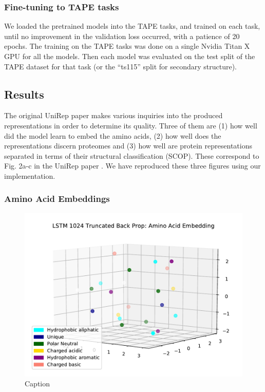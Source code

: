 \documentclass[a4paper,12pt]{article}
\begin{document}
\subsubsection{Fine-tuning to TAPE tasks}
We loaded the pretrained models into the TAPE tasks, and trained on each task, until no improvement in the validation loss occurred, with a patience of 20 epochs. The training on the TAPE tasks was done on a single Nvidia Titan X GPU for all the models. Then each model was evaluated on the test split of the TAPE dataset for that task (or the ``ts115'' split for secondary structure).

\subsection{Results}
The original UniRep paper makes various inquiries into the produced representations in order to determine its quality. Three of them are (1) how well did the model learn to embed the amino acids, (2) how well does the representations discern proteomes and (3) how well are protein representations separated in terms of their structural classification (SCOP). These correspond to Fig. 2a-c in the UniRep paper \cite{alley2019unified}. We have reproduced these three figures using our implementation.

\subsubsection{Amino Acid Embeddings}

\begin{figure}[H]
    \centering
    \includegraphics[width=0.8\linewidth]{figures/fig2a_LSTM_1024.pdf}
    \caption{Caption}
    \label{fig:fig2a_LSTM}
\end{figure}
\end{document}
